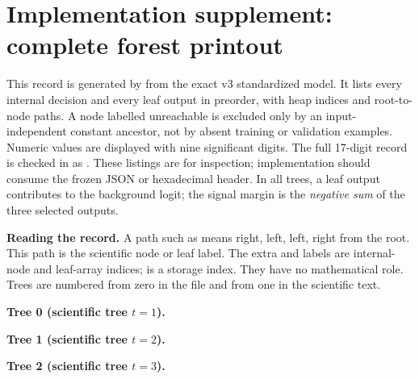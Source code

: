 \section*{Implementation supplement: complete forest printout}
\begin{implementation}
This record is generated by  from the exact v3
standardized model. It lists every internal decision and every leaf output in
preorder, with heap indices and root-to-node paths. A node labelled unreachable
is excluded only by an input-independent constant ancestor, not by absent
training or validation examples. Numeric values are displayed with nine
significant digits. The full 17-digit record is checked in as
. These listings are for
inspection; implementation should consume the frozen JSON or hexadecimal
header. In all trees, a leaf output contributes to the background logit; the
signal margin is the \emph{negative sum} of the three selected outputs.


\textbf{Reading the record.} A path such as  means right, left, left, right from the root. This path is the scientific node or leaf label. The extra  and  labels are internal-node and leaf-array indices;  is a storage index. They have no mathematical role. Trees are numbered from zero in the file and from one in the scientific text.
\end{implementation}
\begin{implementation}
\textbf{Tree 0 (scientific tree $t=1$).}\par

\end{implementation}
\begin{implementation}
\textbf{Tree 1 (scientific tree $t=2$).}\par

\end{implementation}
\begin{implementation}
\textbf{Tree 2 (scientific tree $t=3$).}\par

\end{implementation}
